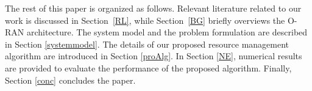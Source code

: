 \documentclass[lettersize,journal]{IEEEtran}
\begin{document}
The rest of this paper is organized as follows.
Relevant literature related to our work is discussed in Section~\ref{RL}, while Section~\ref{BG} briefly overviews the O-RAN architecture.
The system model and the problem formulation are described in Section \ref{systemmodel}. The details of our proposed resource management algorithm are introduced in Section \ref{proAlg}. In Section \ref{NE}, numerical results are provided to evaluate the performance of the proposed algorithm. Finally, Section \ref{conc} concludes the paper.
\begin{table}[H]
 \caption {List of Acronyms} \label{table:1a}
 \begin{center}
 \end{center}
 \end{table}
\end{document}

